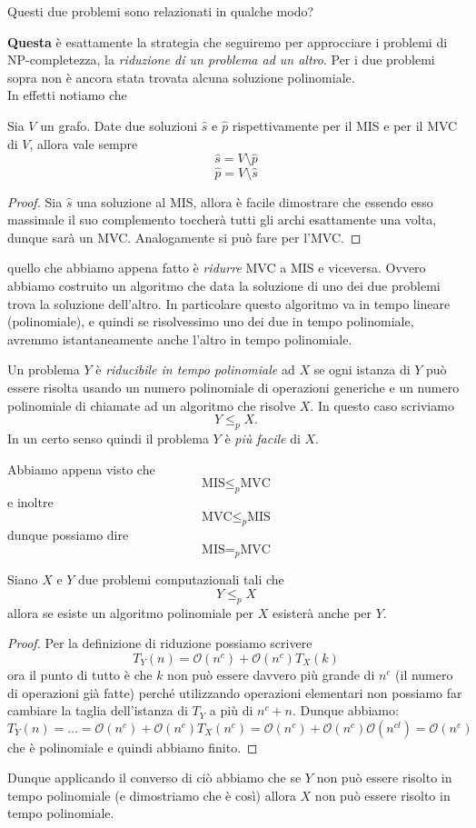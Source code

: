 \documentclass[11pt]{scrartcl}
\newcommand{\bigo}{\mathcal{O}}
\begin{document}
	\begin{problem}
		Questi due problemi sono relazionati in qualche modo?
	\end{problem}
	\textbf{Questa} è esattamente la strategia che seguiremo per approcciare i problemi di NP-completezza, la \textit{riduzione di un problema ad un altro}. Per i due problemi sopra non è ancora stata trovata alcuna soluzione polinomiale. \\
	In effetti notiamo che
	\begin{lemma}[MIS=MVC]
		Sia $V$ un grafo. Date due soluzioni $\hat{s}$ e $\hat{p}$ rispettivamente per il MIS e per il MVC di $V$, allora vale sempre
		$$\hat{s}=V\setminus \hat{p}$$
		$$\hat{p}=V\setminus \hat{s}$$
	\end{lemma}
	\begin{proof}
		Sia $\hat{s}$ una soluzione al MIS, allora è facile dimostrare che essendo esso massimale il suo complemento toccherà tutti gli archi esattamente una volta, dunque sarà un MVC. Analogamente si può fare per l'MVC.
	\end{proof}
	quello che abbiamo appena fatto è \textit{ridurre} MVC a MIS e viceversa. Ovvero abbiamo costruito un algoritmo che data la soluzione di uno dei due problemi trova la soluzione dell'altro. In particolare questo algoritmo va in tempo lineare (polinomiale), e quindi se risolvessimo uno dei due in tempo polinomiale, avremmo istantaneamente anche l'altro in tempo polinomiale.
	\begin{definition}
		Un problema $Y$ è \textit{riducibile in tempo polinomiale} ad $X$ se ogni istanza di $Y$ può essere risolta usando un numero polinomiale di operazioni generiche e un numero polinomiale di chiamate ad un algoritmo che risolve $X$. In questo caso scriviamo
		$$Y\le_p X.$$
		In un certo senso quindi il problema $Y$ è \textit{più facile} di $X$.
	\end{definition}
	Abbiamo appena visto che
	$$\text{MIS}\le_p \text{MVC}$$
	e inoltre
	$$\text{MVC}\le_p \text{MIS}$$
	dunque possiamo dire
	$$\text{MIS}=_p\text{MVC}$$
	\begin{lemma}
		Siano $X$ e $Y$ due problemi computazionali tali che
		$$Y\le_p X$$
		allora se esiste un algoritmo polinomiale per $X$ esisterà anche per $Y$.
	\end{lemma}
	\begin{proof}
		Per la definizione di riduzione possiamo scrivere
		$$T_Y(n)=\bigo(n^c)+\bigo(n^c)T_X(k)$$
		ora il punto di tutto è che $k$ non può essere davvero più grande di $n^c$ (il numero di operazioni già fatte) perché utilizzando operazioni elementari non possiamo far cambiare la taglia dell'istanza di $T_Y$ a più di $n^c+n$. Dunque abbiamo:
		$$T_Y(n)=\dots=\bigo(n^c)+\bigo(n^c)T_X(n^c)=\bigo(n^c)+\bigo(n^c)\bigo(n^{cl})=\bigo(n^{e})$$
		che è polinomiale e quindi abbiamo finito.
	\end{proof}
	Dunque applicando il converso di ciò abbiamo che se $Y$ non può essere risolto in tempo polinomiale (e dimostriamo che è così) allora $X$ non può essere risolto in tempo polinomiale. 
\end{document}
